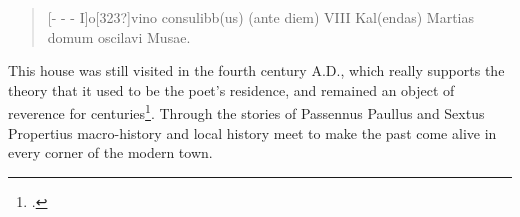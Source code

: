 \documentclass[amsthm,ebook]{saparticle}
\begin{document}
\begin{quotation}
[{}- - - I]o[323?]vino consulibb(us) (ante diem) VIII Kal(endas) Martias domum oscilavi Musae. 
\end{quotation}

This house was still visited in the fourth century A.D., which really supports the theory that it used to be the poet’s
residence, and remained an object of reverence for centuries\footnote{\citet[244-246]{Boldrighini2014}.}. Through the stories
of Passennus Paullus and Sextus Propertius macro-history and local history meet to make the past come alive in every
corner of the modern town.



\end{document}
